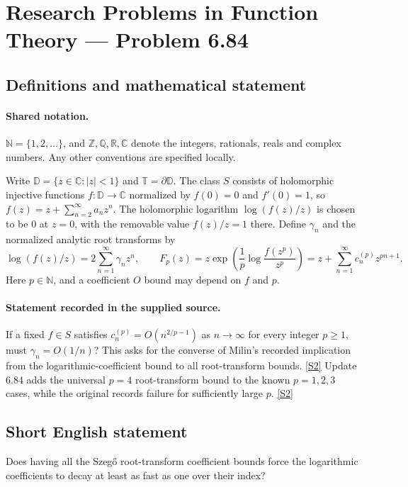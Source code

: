\documentclass[11pt]{article}
\newcommand{\sref}[2]{\hyperlink{source:#1:#2}{[S#2]}}
\begin{document}
\section{Research Problems in Function Theory — Problem 6.84}\label{statement}

\subsection{Definitions and mathematical statement}

\paragraph{Shared notation.}$\mathbb N=\{1,2,\ldots\}$, and $\mathbb Z,\mathbb Q,\mathbb R,\mathbb C$ denote the integers, rationals, reals and complex numbers. Any other conventions are specified locally.


Write $\mathbb D=\{z\in\mathbb C:|z|<1\}$ and $\mathbb T=\partial\mathbb D$. The class $S$ consists of holomorphic injective functions $f:\mathbb D\to\mathbb C$ normalized by $f(0)=0$ and $f'(0)=1$, so $f(z)=z+\sum_{n=2}^{\infty}a_nz^n$. The holomorphic logarithm $\log(f(z)/z)$ is chosen to be $0$ at $z=0$, with the removable value $f(z)/z=1$ there. Define $\gamma_n$ and the normalized analytic root transforms by \[\log(f(z)/z)=2\sum_{n=1}^{\infty}\gamma_nz^n,\qquad F_p(z)=z\exp\!\left(\frac1p\log\frac{f(z^p)}{z^p}\right)=z+\sum_{n=1}^{\infty}c_n^{(p)}z^{pn+1}.\] Here $p\in\mathbb N$, and a coefficient $O$ bound may depend on $f$ and $p$.
\paragraph{Statement recorded in the supplied source.}
If a fixed $f\in S$ satisfies $c_n^{(p)}=O(n^{2/p-1})$ as $n\to\infty$ for every integer $p\ge1$, must $\gamma_n=O(1/n)$? This asks for the converse of Milin's recorded implication from the logarithmic-coefficient bound to all root-transform bounds. \sref{statement}{2}
Update 6.84 adds the universal $p=4$ root-transform bound to the known $p=1,2,3$ cases, while the original records failure for sufficiently large $p$. \sref{statement}{2}
\subsection{Short English statement}
Does having all the Szegő root-transform coefficient bounds force the logarithmic coefficients to decay at least as fast as one over their index?
\end{document}
